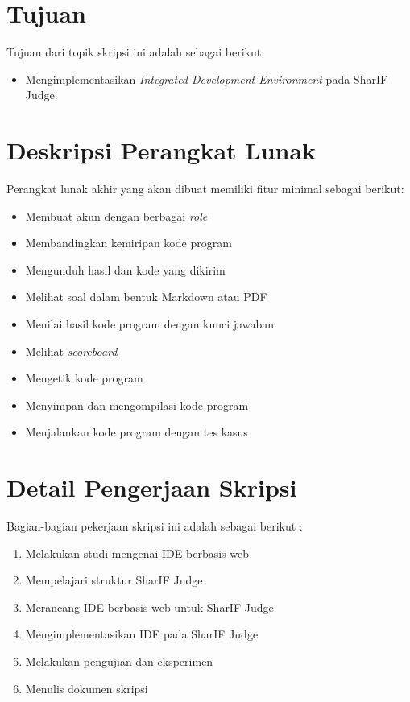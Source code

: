 \documentclass[a4paper,twoside]{article}
\begin{document}
\section{Tujuan}
Tujuan dari topik skripsi ini adalah sebagai berikut:
\begin{itemize}
	\item Mengimplementasikan {\it Integrated Development Environment} pada SharIF Judge.
\end{itemize}

\section{Deskripsi Perangkat Lunak}
Perangkat lunak akhir yang akan dibuat memiliki fitur minimal sebagai berikut:
\begin{itemize}
	\item Membuat akun dengan berbagai {\it role}
	\item Membandingkan kemiripan kode program
	\item Mengunduh hasil dan kode yang dikirim
	\item Melihat soal dalam bentuk Markdown atau PDF
	\item Menilai hasil kode program dengan kunci jawaban
	\item Melihat {\it scoreboard}
	\item Mengetik kode program
	\item Menyimpan dan mengompilasi kode program
	\item Menjalankan kode program dengan tes kasus
\end{itemize}

\section{Detail Pengerjaan Skripsi}
Bagian-bagian pekerjaan skripsi ini adalah sebagai berikut :
\begin{enumerate}
	\item Melakukan studi mengenai IDE berbasis web
	\item Mempelajari struktur SharIF Judge
	\item Merancang IDE berbasis web untuk SharIF Judge
	\item Mengimplementasikan IDE pada SharIF Judge
	\item Melakukan pengujian dan eksperimen
	\item Menulis dokumen skripsi
\end{enumerate}
\end{document}
